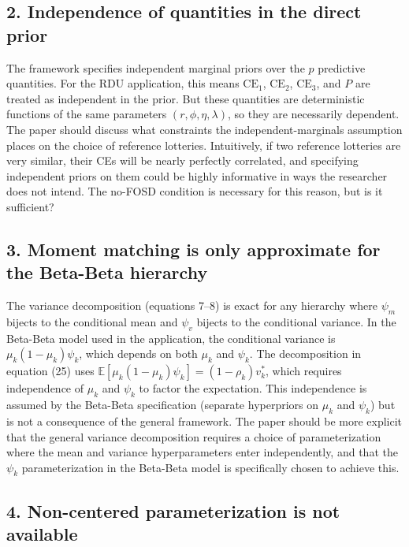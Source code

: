 \documentclass[12pt]{article}
\begin{document}
\subsection*{2. Independence of quantities in the direct prior}

The framework specifies independent marginal priors over the $p$ predictive
quantities. For the RDU application, this means $\text{CE}_1$, $\text{CE}_2$,
$\text{CE}_3$, and $P$ are treated as independent in the prior. But these
quantities are deterministic functions of the same parameters $(r, \phi, \eta,
\lambda)$, so they are necessarily dependent. The paper should discuss what
constraints the independent-marginals assumption places on the choice of
reference lotteries. Intuitively, if two reference lotteries are very similar,
their CEs will be nearly perfectly correlated, and specifying independent
priors on them could be highly informative in ways the researcher does not
intend. The no-FOSD condition is necessary for this reason, but is it
sufficient?

\subsection*{3. Moment matching is only approximate for the Beta-Beta hierarchy}

The variance decomposition (equations 7--8) is exact for any hierarchy where
$\psi_m$ bijects to the conditional mean and $\psi_v$ bijects to the
conditional variance. In the Beta-Beta model used in the application, the
conditional variance is $\mu_k(1 - \mu_k)\psi_k$, which depends on both
$\mu_k$ and $\psi_k$. The decomposition in equation (25) uses
$\mathbb{E}[\mu_k(1-\mu_k)\psi_k] = (1-\rho_k)v^*_k$, which requires
independence of $\mu_k$ and $\psi_k$ to factor the expectation. This
independence is assumed by the Beta-Beta specification (separate hyperpriors on
$\mu_k$ and $\psi_k$) but is not a consequence of the general framework.
The paper should be more explicit that the general variance decomposition
requires a choice of parameterization where the mean and variance
hyperparameters enter independently, and that the $\psi_k$ parameterization in
the Beta-Beta model is specifically chosen to achieve this.

\subsection*{4. Non-centered parameterization is not available}
\end{document}
